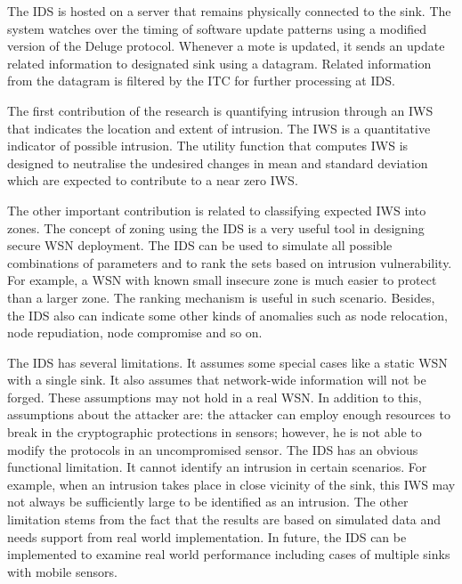 \documentclass[conference,manuscript]{IEEEtran}
\begin{document}
The IDS is hosted on a server that remains physically connected to the  sink. 
The system watches over the timing of software update patterns using a modified version of the Deluge protocol.
Whenever a mote is updated, it sends an update related information to designated sink using a datagram.  
Related information from the datagram is filtered by the ITC for further processing at IDS.

The first contribution of the research is quantifying intrusion through an IWS that indicates the location and extent of intrusion.
The IWS is a quantitative indicator of possible intrusion.
The utility function that computes IWS is designed to neutralise the undesired %
changes in mean and standard deviation which are expected to contribute to a near zero IWS.

The other important contribution is related to classifying expected IWS into zones.
The concept of zoning using the IDS is a very useful tool in designing secure WSN deployment.
The IDS can be used to simulate all possible combinations of parameters and  to rank the sets based on intrusion vulnerability.
For example, a WSN with known small insecure zone is much easier to protect than a larger zone.
The ranking mechanism is useful in such scenario.
Besides, the IDS also can indicate some other kinds of anomalies such as node relocation, node repudiation, node compromise and so on.

The IDS has several limitations. 
It assumes some special cases like a static WSN with a single sink.
It also assumes that network-wide information will not be forged. %
These assumptions may not hold in a real WSN.
In addition to this, assumptions about the attacker are: the attacker can employ enough resources to break in the cryptographic protections in sensors; however, he is not able to modify the protocols in an uncompromised sensor.
The IDS has an obvious functional limitation.
It cannot identify an intrusion in certain scenarios.
For example, when an intrusion takes place in close vicinity of the sink, this IWS may not always be sufficiently large to be identified as an intrusion.
The other limitation stems from the fact that the results are based on simulated data and needs support from real world implementation.
In future,  the IDS can be implemented to examine real world performance including cases of multiple sinks with mobile sensors.
\end{document}
